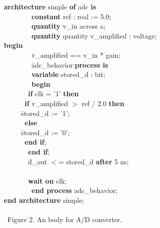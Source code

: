 {\small
\begin{tabbing}
\ \ \ \= \textbf{architecture} simple \textbf{of} adc \textbf{is} \\
\> \ \ \ \ \ \ \ \ \ \ \ \= \textbf{constant} ref : real := 5.0; \\
\> \ \ \ \ \ \ \ \ \ \ \ \= \textbf{quantity} v\_in across a; \\
\> \ \ \ \ \ \ \ \ \ \ \ \= \textbf{quantity} quantity v\_amplified : voltage; \\
\ \ \ \= \textbf{begin} \\
\> \ \ \ \ \ \ \ \ \ \ \ \= v\_amplified == v\_in * gain; \\
\> \ \ \ \ \ \ \ \ \ \ \ \= adc\_behavior:\textbf{process is} \\
\> \ \ \ \ \ \ \ \ \ \ \ \= \textbf{variable} stored\_d : bit; \\
\> \ \ \ \ \ \ \ \ \ \ \ \= \textbf{begin} \\
\> \> \ \ \ \ \ \ \ \ \ \ \= \textbf{if} clk = '1' \textbf{then} \\
\> \> \> \ \ \ \ \ \ \ \ \ \= \textbf{if} v\_amplified $>$ ref / 2.0 \textbf{then} \\
\> \> \> \> \ \ \ \ \ \ \ \ \= stored\_d := '1'; \\
\> \> \> \ \ \ \ \ \ \ \ \ \= \textbf{else} \\
\> \> \> \> \ \ \ \ \ \ \ \ \= stored\_d := '0'; \\
\> \> \> \ \ \ \ \ \ \ \ \ \= \textbf{end if}; \\
\> \> \ \ \ \ \ \ \ \ \ \ \=\textbf{end if};\\
\> \> \ \ \ \ \ \ \ \ \ \ \= d\_out $<$= stored\_d \textbf{after} 5 ns;\\ \\
\> \> \ \ \ \ \ \ \ \ \ \ \= \textbf{wait on} clk;\\
\> \ \ \ \ \ \ \ \ \ \ \ \= \textbf{end process} adc\_behavior;\\
\ \ \ \= \textbf{end architecture} simple;
\ \ \ \     \\
\ \ \ \     \\
\ \ \ \ Figure 2. An \arch body for A/D converter.
\end{tabbing}
}





